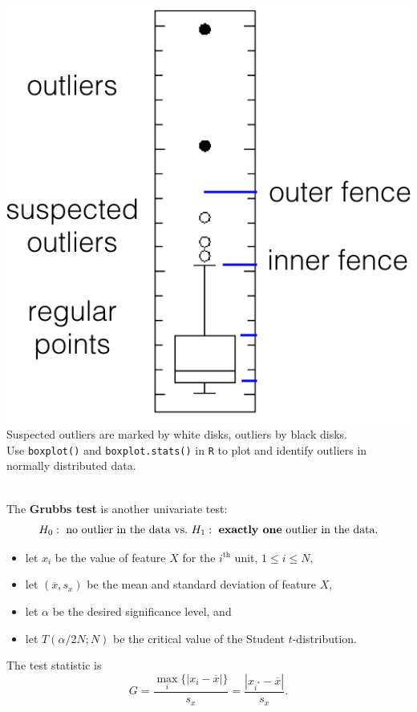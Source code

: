\documentclass[20pt,landscape,footrule,headrule]{foils}
\begin{document}
\begin{center}
\includegraphics[height=0.8\textheight]{Images/boxplot_EN.png}
\\
Suspected outliers are marked by white disks, outliers by black disks.  \\ Use \texttt{boxplot()} and \texttt{boxplot.stats()} in \texttt{R} to plot and identify outliers in normally distributed data.
\end{center}
\newpage\ \\ \noindent The \textbf{Grubbs test} is another univariate test: 
$$H_0: \text{ no outlier in the data vs.\@ } H_1: \text{ \textbf{exactly one} outlier in the data.}$$

\begin{itemize}
\item let $x_i$ be the value of feature $X$ for the $i^{\textrm{th}}$ unit, $1\leq i\leq N$,\item  let $(\overline{x},s_x)$ be the mean and standard deviation of feature $X$, 
\item let $\alpha$ be the desired significance level, and 
\item let  $T(\alpha/2N;N)$ be the critical value of the Student $t$-distribution. 
\end{itemize} 
The test statistic is $$G=\frac{\max_i\{|x_i-\overline{x}|\}}{s_x}=\frac{|x_{i^*}-\overline{x}|}{s_x}.$$
\end{document}
